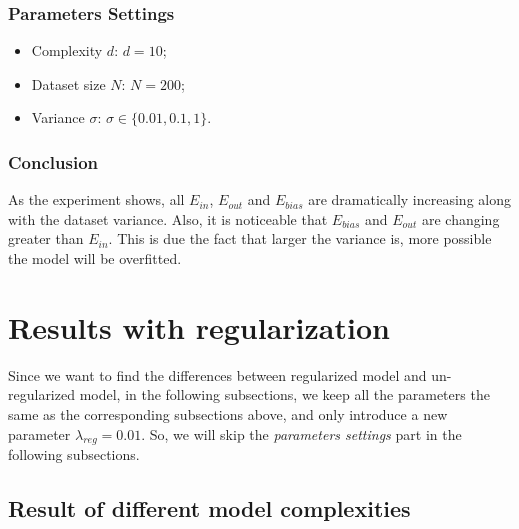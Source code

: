 \documentclass[12pt,letterpaper]{article}
\begin{document}
\subsubsection*{Parameters Settings}
\begin{itemize}
    \item Complexity $d$: $d = 10$;
    \item Dataset size $N$: $N = 200$;
    \item Variance $\sigma$: $\sigma \in \{ 0.01, 0.1, 1 \}$.
\end{itemize}

\subsubsection*{Conclusion}

As the experiment shows, all $E_{in}$, $E_{out}$ and $E_{bias}$ are dramatically increasing along with the dataset variance. Also, it is noticeable that $E_{bias}$ and $E_{out}$ are changing greater than $E_{in}$. This is due the fact that larger the variance is, more possible the model will be overfitted.

\section{Results with regularization}

Since we want to find the differences between regularized model and un-regularized model, in the following subsections, we keep all the parameters the same as the corresponding subsections above, and only introduce a new parameter $\lambda_{reg} = 0.01$. So, we will skip the \emph{parameters settings} part in the following subsections.

\subsection{Result of different model complexities}
\end{document}
